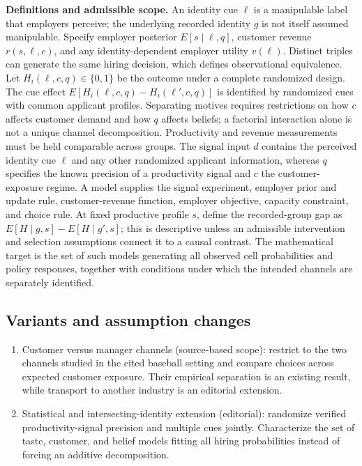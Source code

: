 \documentclass[11pt,a4paper]{article}
\begin{document}
\textbf{Definitions and admissible scope.} An identity cue \(\ell\) is a manipulable label that employers perceive; the underlying recorded identity \(g\) is not itself assumed manipulable. Specify employer posterior \(E[s\mid\ell,q]\), customer revenue \(r(s,\ell,c)\), and any identity-dependent employer utility \(v(\ell)\). Distinct triples can generate the same hiring decision, which defines observational equivalence. Let \(H_i(\ell,c,q)\in\{0,1\}\) be the outcome under a complete randomized design. The cue effect \(E[H_i(\ell,c,q)-H_i(\ell',c,q)]\) is identified by randomized cues with common applicant profiles. Separating motives requires restrictions on how \(c\) affects customer demand and how \(q\) affects beliefs; a factorial interaction alone is not a unique channel decomposition. Productivity and revenue measurements must be held comparable across groups. The signal input \(d\) contains the perceived identity cue \(\ell\) and any other randomized applicant information, whereas \(q\) specifies the known precision of a productivity signal and \(c\) the customer-exposure regime. A model supplies the signal experiment, employer prior and update rule, customer-revenue function, employer objective, capacity constraint, and choice rule. At fixed productive profile \(s\), define the recorded-group gap as \(E[H\mid g,s]-E[H\mid g',s]\); this is descriptive unless an admissible intervention and selection assumptions connect it to a causal contrast. The mathematical target is the set of such models generating all observed cell probabilities and policy responses, together with conditions under which the intended channels are separately identified.
\subsection*{Variants and assumption changes}
\begin{enumerate}
\item Customer versus manager channels (source-based scope): restrict to the two channels studied in the cited baseball setting and compare choices across expected customer exposure. Their empirical separation is an existing result, while transport to another industry is an editorial extension.
\item Statistical and intersecting-identity extension (editorial): randomize verified productivity-signal precision and multiple cues jointly. Characterize the set of taste, customer, and belief models fitting all hiring probabilities instead of forcing an additive decomposition.
\end{enumerate}
\end{document}
